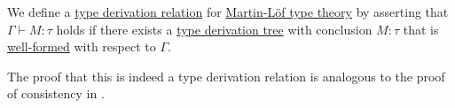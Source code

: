 \begin{definition}\label{def:mltt_entailment}\mimprovised
  We define a \hyperref[def:type_derivation_relation]{type derivation relation} for \hyperref[def:mltt]{Martin-L\"of type theory} by asserting that \( \Gamma \vdash M: \tau \) holds if there exists a \hyperref[def:type_derivation_tree]{type derivation tree} with conclusion \( M: \tau \) that is \hyperref[def:mltt_well_formed_context/derivation]{well-formed} with respect to \( \Gamma \).
\end{definition}
\begin{comments}
  \item The proof that this is indeed a type derivation relation is analogous to the proof of consistency in .
\end{comments}


